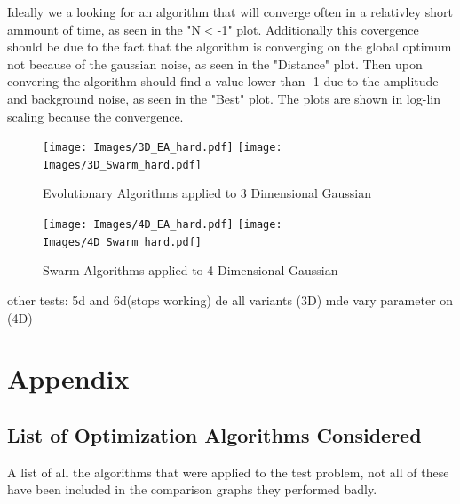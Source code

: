 \documentclass[a4paper,titlepage]{report}
\begin{document}
Ideally we a looking for an algorithm that will converge often in a relativley short ammount of time, as seen in the "N$<$-1" plot. Additionally this covergence should be due to the fact that the algorithm is converging on the global optimum not because of the gaussian noise, as seen in the "Distance" plot. Then upon convering the algorithm should find a value lower than -1 due to the amplitude and background noise, as seen in the "Best" plot. The plots are shown in log-lin scaling because the convergence.


\begin{figure}[htb]
\centering
\texttt{[image: Images/3D\_EA\_hard.pdf]}
\vspace{0.5cm}
\texttt{[image: Images/3D\_Swarm\_hard.pdf]}
\caption{Evolutionary Algorithms applied to 3 Dimensional Gaussian}
\label{fig: 3d_ea_hard}
\end{figure}

\begin{figure}[htb]
\centering
\texttt{[image: Images/4D\_EA\_hard.pdf]}
\vspace{0.5cm}
\texttt{[image: Images/4D\_Swarm\_hard.pdf]}
\caption{Swarm Algorithms applied to 4 Dimensional Gaussian}
\label{fig: best hard}
\end{figure}



other tests:
5d and 6d(stops working)
de all variants (3D)
mde vary parameter on (4D)


\chapter{Appendix}

\section{List of Optimization Algorithms Considered}

A list of all the algorithms that were applied to the test problem, not all of these have been included in the comparison graphs they performed badly.
\end{document}
